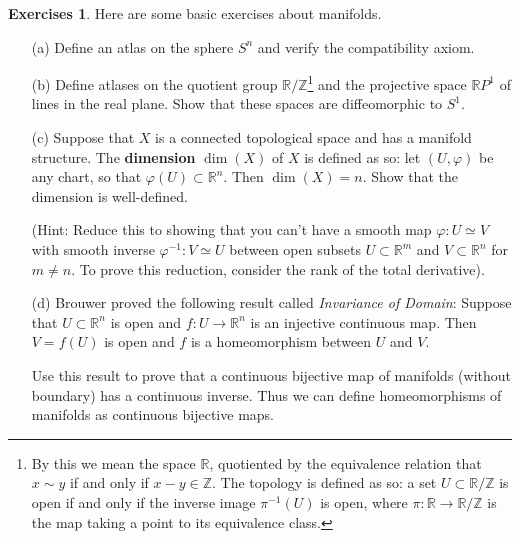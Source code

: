 \documentclass[12pt]{article}
\theoremstyle{definition}
\newtheorem{exercises}[theorem]{Exercises}
\numberwithin{equation}{section}
\newcommand{\R}{{\mathbb R}}
\newcommand{\Z}{{\mathbb Z}}
\newcommand{\op}{\operatorname}
\begin{document}
\begin{exercises} \label{exs:manifolds} Here are some basic exercises about manifolds.
\begin{enumerate}
	\item[(a)] Define an atlas on the sphere $S^n$ and verify the compatibility axiom.
	\item[(b)] Define atlases on the quotient group $\R/\Z$\footnote{By this we mean the space $\R$, quotiented by the equivalence relation that $x \sim y$ if and only if $x - y \in \Z$. The topology is defined as so: a set $U \subset \R/\Z$ is open if and only if the inverse image $\pi^{-1}(U)$ is open, where $\pi:\R \to \R/\Z$ is the map taking a point to its equivalence class.} and the projective space $\R P^1$ of lines in the real plane. Show that these spaces are diffeomorphic to $S^1$.
	\item[(c)] Suppose that $X$ is a connected topological space and has a manifold structure. The {\bf dimension} $\op{dim}(X)$ of $X$ is defined as so: let $(U,\varphi)$ be any chart, so that $\varphi(U) \subset \R^n$. Then $\op{dim}(X) = n$. Show that the dimension is well-defined. 

	(Hint: Reduce this to showing that you can't have a smooth map $\varphi:U \simeq V$ with smooth inverse $\varphi^{-1}:V \simeq U$ between open subsets $U \subset \R^m$ and $V \subset \R^n$ for $m \neq n$. To prove this reduction, consider the rank of the total derivative).
	\item[(d)] Brouwer proved the following result called \emph{Invariance of Domain}: Suppose that $U \subset \R^n$ is open and $f:U \to \R^n$ is an injective continuous map. Then $V = f(U)$ is open and $f$ is a homeomorphism between $U$ and $V$. 

	Use this result to prove that a continuous bijective map of manifolds (without boundary) has a continuous inverse. Thus we can define homeomorphisms of manifolds as continuous bijective maps.
\end{enumerate}
\end{exercises}
\end{document}
